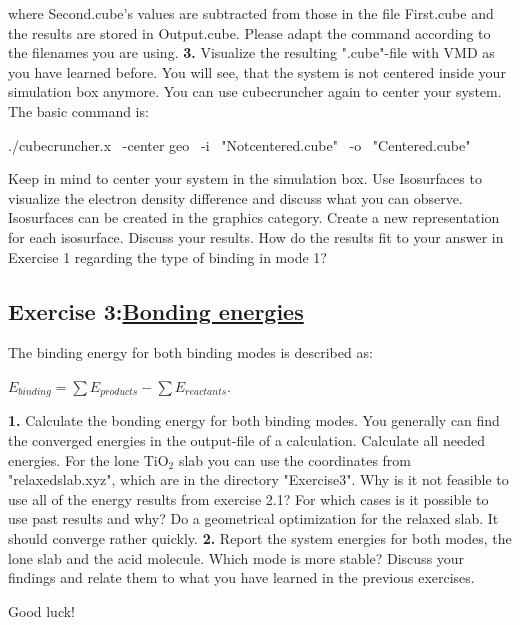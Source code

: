 \documentclass[]{article}
\begin{document}
where Second.cube's values are subtracted from those in the file First.cube and the results are stored in Output.cube. Please adapt the command according to the filenames you are using. 
\newline
\newline
\newpage
\textbf{3.} Visualize the resulting ".cube"-file with VMD as you have learned before. You will see, that the system is not centered inside your simulation box anymore. You can use cubecruncher again to center your system. The basic command is:
\begin{center}
./cubecruncher.x \ -center geo \ -i \ "Notcentered.cube" \ -o \ "Centered.cube"
\end{center}


Keep in mind to center your system in the simulation box. Use Isosurfaces to visualize the electron density difference and discuss what you can observe. Isosurfaces can be created in the graphics category. Create a new representation for each isosurface. Discuss your results. How do the results fit to your answer in Exercise 1 regarding the type of binding in mode 1? 




\subsection*{Exercise 3:\underline{Bonding energies}}

The binding energy for both binding modes is described as:

\begin{center}
$E_{binding}=\sum E_{products}-\sum  E_{reactants}.$
\end{center}
\newline
\textbf{1.} Calculate the bonding energy for both binding modes. You generally can find the converged energies in the output-file of a calculation. 
\newline
\newline
Calculate all needed energies. For the lone TiO$_{2}$ slab you can use the coordinates from "relaxedslab.xyz", which are in the directory "Exercise3". Why is it not feasible to use all of the energy results from exercise 2.1? For which cases is it possible to use past results and why? Do a geometrical optimization for the relaxed slab. It should converge rather quickly. 
\newline
\newline
\textbf{2.} Report the system energies for both modes, the lone slab and the acid molecule. Which mode is more stable? Discuss your findings and relate them to what you have learned in the previous exercises. 
\newline
\newline

Good luck!
\end{document}
